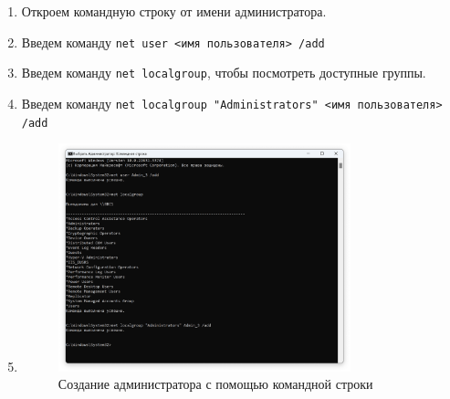 \documentclass[a4paper, 14pt]{report}
\begin{document}
\begin{enumerate}
    \item Откроем командную строку от имени администратора.
    \item Введем команду \texttt{net user <имя пользователя> /add}
    \item Введем команду \texttt{net localgroup}, чтобы посмотреть доступные группы.
    \item Введем команду \texttt{net localgroup "Administrators" <имя пользователя> /add}
    \item {
          \begin{figure}[H]
              \centering
              \includegraphics[width=0.8\textwidth]{../images/cmd_create_admin.png}
              \caption{Создание администратора с помощью командной строки}
          \end{figure}
          }
\end{enumerate}
\end{document}
